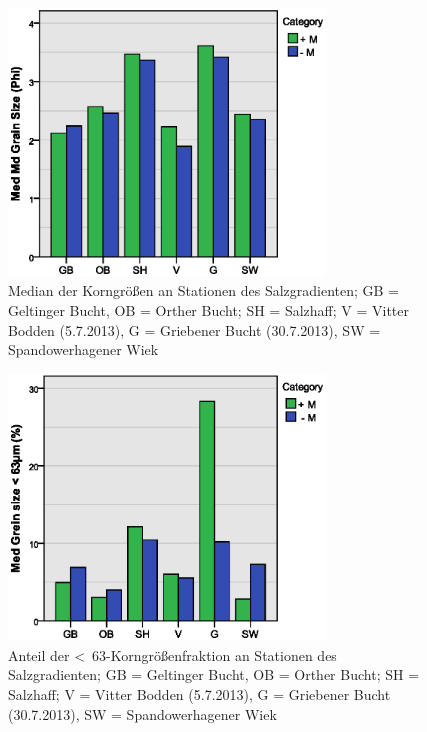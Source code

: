 \begin{figure}[!htb]
\centering
\includegraphics[width=0.75\textwidth]{images/salzsedimentauswertung/bar_mgsize.eps}
\caption[Median der Korngrößen an Stationen des Salzgradienten]{Median der Korngrößen an Stationen des Salzgradienten; GB = Geltinger Bucht, OB = Orther Bucht; SH = Salzhaff; V = Vitter Bodden (5.7.2013), G = Griebener Bucht (30.7.2013), SW = Spandowerhagener Wiek}
\label{fig:sg:mittlere_kg}
\end{figure}

\begin{figure}[!htb]
\centering
\includegraphics[width=0.75\textwidth]{images/salzsedimentauswertung/bar_63.eps}
\caption[Anteil der \unit{<63}{\mu\metre}-Korngrößenfraktion an Stationen des Salzgradienten]{Anteil der \unit{<63}{\mu\metre}-Korngrößenfraktion an Stationen des Salzgradienten; GB = Geltinger Bucht, OB = Orther Bucht; SH = Salzhaff; V = Vitter Bodden (5.7.2013), G = Griebener Bucht (30.7.2013), SW = Spandowerhagener Wiek}
\label{fig:sg:kleiner_63}
\end{figure}

